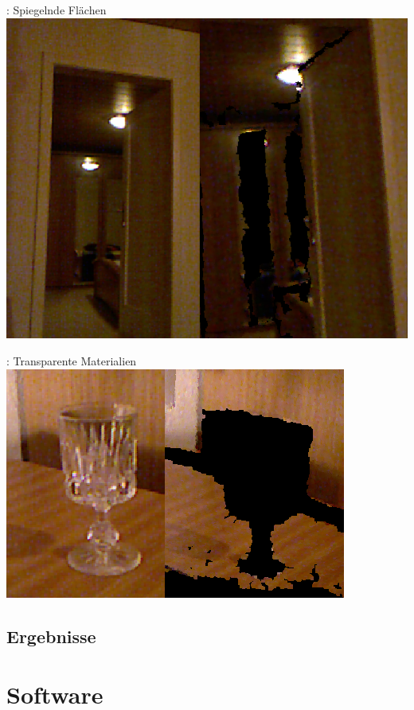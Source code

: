 \documentclass{VLKlauck}
\begin{document}
	\begin{frame}{\insertsubsection: Spiegelnde Flächen}	
		\includegraphics[scale=0.8]{Mirror.png}
	\end{frame}
	
	\begin{frame}{\insertsubsection: Transparente Materialien}	
		\includegraphics[scale=1]{glas.png} 	
	\end{frame}
	
	\subsection{Ergebnisse}

	
	
	
	\section{Software}  
\end{document}
